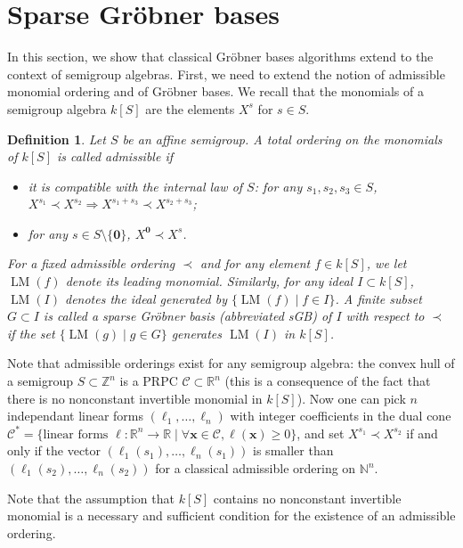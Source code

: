 \documentclass[12pt]{article}
\numberwithin{equation}{section}
\numberwithin{theorem}{section}
\newtheorem{definition}[theorem]{Definition}
\newcommand{\Z}{\mathbb{Z}}
\DeclareMathOperator{\LM}{LM}
\newcommand{\sgp}{S}
\newcommand{\cone}{\mathscr C}
\newcommand{\R}{\mathbb{R}}
\newcommand{\N}{\mathbb{N}}
\begin{document}
\section{Sparse Gr\"obner bases}\label{sec:sGB}
In this section, we show that classical Gr\"obner bases algorithms
extend to the context of semigroup algebras.  First, we need to extend
the notion of admissible monomial ordering and of Gr\"obner bases.  We
recall that the monomials of a semigroup algebra $k[\sgp]$ are the
elements $X^s$ for $s\in\sgp$.

\begin{definition}\label{def:sGB}
Let $\sgp$ be an affine semigroup. A total ordering on the monomials of $k[\sgp]$ is called \emph{admissible} if 
\begin{itemize}
\item it is compatible with the internal law of $\sgp$: for any $s_1,s_2,s_3\in \sgp$, $X^{s_1}\prec X^{s_2}\Rightarrow X^{s_1+s_3}\prec X^{s_2+s_3}$;
\item for any $s\in \sgp\setminus\{\mathbf 0\}$, $X^{\mathbf 0}\prec X^{s}$.
\end{itemize}
For a fixed admissible ordering $\prec$ and for any element $f\in k[\sgp]$, we let $\LM(f)$ denote its leading monomial. Similarly, for any ideal $I\subset k[\sgp]$, $\LM(I)$ denotes the ideal generated by $\{\LM(f) \mid f \in I\}$. A finite subset $G\subset I$ is called a \emph{sparse Gr\"obner basis} (abbreviated sGB) of $I$ with respect to $\prec$ if the set $\{\LM(g) \mid g \in G\}$ generates $\LM(I)$ in $k[\sgp]$.
\end{definition}
Note that admissible orderings exist for any semigroup algebra: the
convex hull of a semigroup $\sgp\subset\Z^n$ is a PRPC $\cone\subset\R^n$
(this is a consequence of the fact that there is no nonconstant invertible monomial
 in $k[\sgp]$).  Now one can pick $n$ independant
linear forms $(\ell_1,\ldots,\ell_n)$ with integer coefficients in the
dual cone $\cone^*=\{\text{linear forms }\ell:\R^n\rightarrow \R \mid
\forall \mathbf x\in \cone,\ell(\mathbf x)\geq 0\}$, and set $X^{s_1}\prec X^{s_2}$ if
and only if the vector $(\ell_1(s_1),\ldots,\ell_n(s_1))$ is smaller
than $(\ell_1(s_2),\ldots,\ell_n(s_2))$ for a classical admissible
ordering on $\N^n$.

Note that the assumption that $k[\sgp]$ contains no nonconstant invertible monomial is
a necessary and sufficient condition for the existence of an admissible ordering.

\smallskip
\end{document}
